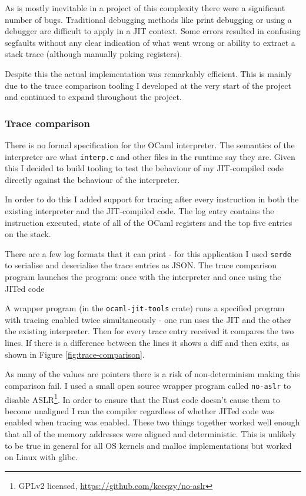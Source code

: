As is mostly inevitable in a project of this complexity there were a significant number of bugs.
Traditional debugging methods like print debugging or using a debugger are difficult to apply in
a JIT context. Some errors resulted in confusing segfaults without any clear indication of what
went
wrong or ability to extract a stack trace (although manually poking registers).

Despite this the actual implementation was remarkably efficient. This is mainly due to the trace
comparison tooling I developed at the very start of the project and continued to expand throughout
the project.

\subsubsection{Trace comparison} \label{trace-comparison}

There is no formal specification for the OCaml interpreter. The semantics of the interpreter are
what
\texttt{interp.c} and other files in the runtime say they are. Given this I decided to build
tooling to test the behaviour of my JIT-compiled code directly against the behaviour of the
interpreter.

In order to do this I added support for tracing after every instruction in both the existing
interpreter and the JIT-compiled code. The log entry contains the instruction executed, state of
all of the OCaml registers and the top five entries on the stack.

There are a few log formats that it can print - for this application I used \texttt{serde} to
serialise and deserialise the trace entries as JSON. The trace comparison program launches the
program: once with the interpreter and once using the JITed code

A wrapper program (in the \texttt{ocaml-jit-tools} crate) runs a specified program with
tracing enabled twice simultaneously - one run uses the JIT and the other the
existing interpreter.  Then for every trace entry received it compares the two lines. If there is a
difference between the lines it shows a diff and then exits, as shown in Figure
\ref{fig:trace-comparison}.

As many of the values are pointers there is a risk of non-determinism making this comparison fail.
I used a small open source wrapper program called \texttt{no-aslr} to disable ASLR\footnote{GPLv2
      licensed, \url{https://github.com/kccqzy/no-aslr}}. In order to ensure
that the Rust code doesn't cause them to become unaligned I ran the compiler regardless of whether
JITed code was enabled when tracing was enabled. These two things together worked well enough that
all of the memory addresses were aligned and deterministic. This is unlikely to be true in general
for all OS kernels and malloc implementations but worked on Linux with glibc.

